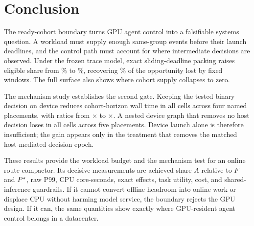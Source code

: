 \section{Conclusion}
\label{sec:conclusion}

The ready-cohort boundary turns GPU agent control into a falsifiable systems
question. A workload must supply enough same-group events before their launch
deadlines, and the control path must account for where intermediate decisions
are observed. Under the frozen trace model, exact sliding-deadline packing
raises eligible share from \TraceFixedPct\% to \TraceExactPct\%, recovering
\TraceGapClosurePct\% of the opportunity lost by fixed windows. The full
surface also shows where cohort supply collapses to zero.

The mechanism study establishes the second gate. Keeping the tested binary
decision on device reduces cohort-horizon wall time in all
\ResidentCells{} cells across four named placements, with ratios from
\ResidentRatioMin$\times$ to \ResidentRatioMax$\times$. A nested device graph
that removes no host decision loses in all \NativeCells{} cells across five
placements. Device launch alone is therefore insufficient; the gain appears
only in the treatment that removes the matched host-mediated decision epoch.

These results provide the workload budget and the mechanism test for an online
route compactor. Its decisive measurements are achieved share $A$ relative to
$F$ and $P^\star$, raw P99, CPU core-seconds, exact effects, task utility, cost,
and shared-inference guardrails. If it cannot convert offline headroom into
online work or displace CPU without harming model service, the boundary rejects
the GPU design. If it can, the same quantities show exactly where GPU-resident
agent control belongs in a datacenter.
